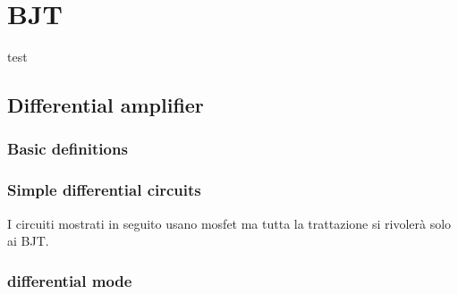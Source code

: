 \section{BJT}
test
\subsection{Differential amplifier}
\subsubsection{Basic definitions}
\subsubsection{Simple differential circuits}
I circuiti mostrati in seguito usano mosfet ma tutta la trattazione si rivolerà solo ai BJT.

\subsubsection{differential mode}
